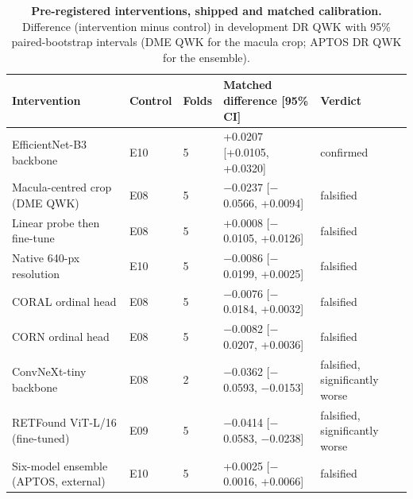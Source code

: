\begin{table}[h]
\caption{\textbf{Pre-registered interventions, shipped and matched calibration.}
Difference (intervention minus control) in development DR QWK with 95\% paired-bootstrap
intervals (DME QWK for the macula crop; APTOS DR QWK for the ensemble).}\label{tab:s3}
\centering\scriptsize
\begin{tabular}{@{}lllll@{}}
\toprule
Intervention & Control & Folds & Matched difference [95\% CI] & Verdict \\
\midrule
EfficientNet-B3 backbone & E10 & 5 & +0.0207 [+0.0105, +0.0320] & confirmed \\
Macula-centred crop (DME QWK) & E08 & 5 & $-$0.0237 [$-$0.0566, +0.0094] & falsified \\
Linear probe then fine-tune & E08 & 5 & +0.0008 [$-$0.0105, +0.0126] & falsified \\
Native 640-px resolution & E10 & 5 & $-$0.0086 [$-$0.0199, +0.0025] & falsified \\
CORAL ordinal head & E08 & 5 & $-$0.0076 [$-$0.0184, +0.0032] & falsified \\
CORN ordinal head & E08 & 5 & $-$0.0082 [$-$0.0207, +0.0036] & falsified \\
ConvNeXt-tiny backbone & E08 & 2 & $-$0.0362 [$-$0.0593, $-$0.0153] & falsified, significantly worse \\
RETFound ViT-L/16 (fine-tuned) & E09 & 5 & $-$0.0414 [$-$0.0583, $-$0.0238] & falsified, significantly worse \\
Six-model ensemble (APTOS, external) & E10 & 5 & +0.0025 [$-$0.0016, +0.0066] & falsified \\
\bottomrule
\end{tabular}
\end{table}
